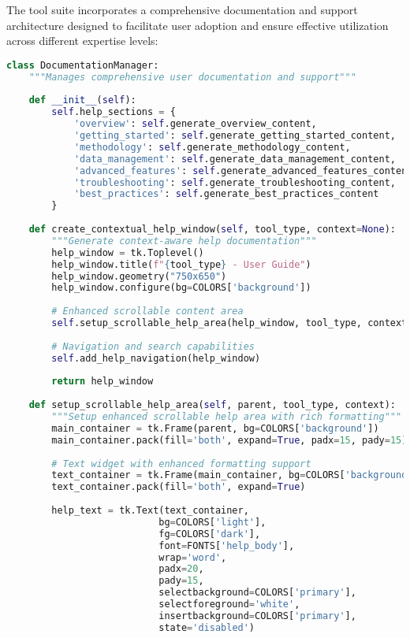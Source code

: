 \documentclass[binding=0.6cm]{sapthesis}
\begin{document}
The tool suite incorporates a comprehensive documentation and support architecture designed to facilitate user adoption and ensure effective utilization across different expertise levels:

\begin{lstlisting}[language=Python, caption=Multi-Modal Help System Architecture]
class DocumentationManager:
    """Manages comprehensive user documentation and support"""
    
    def __init__(self):
        self.help_sections = {
            'overview': self.generate_overview_content,
            'getting_started': self.generate_getting_started_content,
            'methodology': self.generate_methodology_content,
            'data_management': self.generate_data_management_content,
            'advanced_features': self.generate_advanced_features_content,
            'troubleshooting': self.generate_troubleshooting_content,
            'best_practices': self.generate_best_practices_content
        }
    
    def create_contextual_help_window(self, tool_type, context=None):
        """Generate context-aware help documentation"""
        help_window = tk.Toplevel()
        help_window.title(f"{tool_type} - User Guide")
        help_window.geometry("750x650")
        help_window.configure(bg=COLORS['background'])
        
        # Enhanced scrollable content area
        self.setup_scrollable_help_area(help_window, tool_type, context)
        
        # Navigation and search capabilities
        self.add_help_navigation(help_window)
        
        return help_window
    
    def setup_scrollable_help_area(self, parent, tool_type, context):
        """Setup enhanced scrollable help area with rich formatting"""
        main_container = tk.Frame(parent, bg=COLORS['background'])
        main_container.pack(fill='both', expand=True, padx=15, pady=15)
        
        # Text widget with enhanced formatting support
        text_container = tk.Frame(main_container, bg=COLORS['background'])
        text_container.pack(fill='both', expand=True)
        
        help_text = tk.Text(text_container,
                           bg=COLORS['light'],
                           fg=COLORS['dark'],
                           font=FONTS['help_body'],
                           wrap='word',
                           padx=20,
                           pady=15,
                           selectbackground=COLORS['primary'],
                           selectforeground='white',
                           insertbackground=COLORS['primary'],
                           state='disabled')
        

\end{lstlisting}
\end{document}
